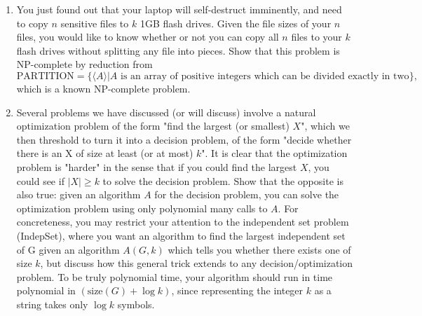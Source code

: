 \documentclass{article}
\theoremstyle{definition}
\begin{document}
\begin{enumerate}
\item You just found out that your laptop will self-destruct imminently, and need to copy $n$ sensitive files to $k$ 1GB flash drives.  Given the file sizes of your $n$ files, you would like to know whether or not you can copy all $n$ files to your $k$ flash drives without splitting any file into pieces.  Show that this problem is NP-complete by reduction from
\begin{equation*}
\text{PARTITION} = \{\langle A\rangle | A \text{ is an array of positive integers which can be divided exactly in two}\},
\end{equation*}
 which is a known NP-complete problem.
\item Several problems we have discussed (or will discuss) involve a natural optimization problem of the form "find the largest (or smallest) $X$", which we then threshold to turn it into a decision problem, of the form "decide whether there is an X of size at least (or at most) $k$".  It is clear that the optimization problem is "harder" in the sense that if you could find the largest $X$, you could see if $|X|\geq k$ to solve the decision problem.  Show that the opposite is also true: given an algorithm $A$ for the decision problem, you can solve the optimization problem using only polynomial many calls to $A$.  For concreteness, you may restrict your attention to the independent set problem (IndepSet), where you want an algorithm to find the largest independent set of G given an algorithm $A(G,k)$ which tells you whether there exists one of size $k$, but discuss how this general trick extends to any decision/optimization problem.  To be truly polynomial time, your algorithm should run in time polynomial in $(\text{size}(G) + \log k)$, since representing the integer $k$ as a string takes only $\log k$ symbols.

\end{enumerate}
\end{document}
